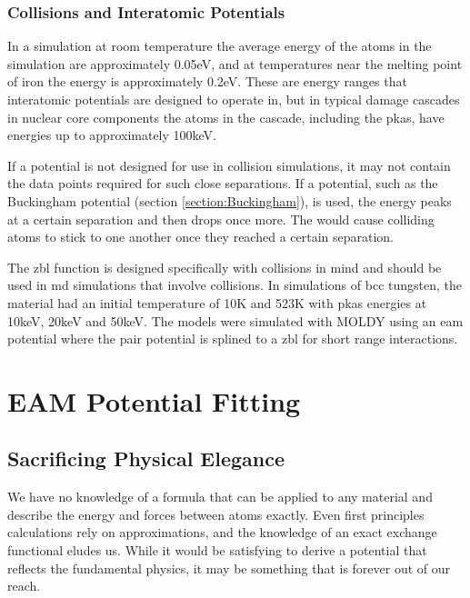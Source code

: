 \subsubsection{Collisions and Interatomic Potentials}

In a simulation at room temperature the average energy of the atoms in the simulation are approximately 0.05eV, and at temperatures near the melting point of iron the energy is approximately 0.2eV.  These are energy ranges that interatomic potentials are designed to operate in, but in typical damage cascades in nuclear core components the atoms in the cascade, including the \acrshort{pka}s, have energies up to approximately 100keV.

If a potential is not designed for use in collision simulations, it may not contain the data points required for such close separations.  If a potential, such as the Buckingham potential (section \ref{section:Buckingham}), is used, the energy peaks at a certain separation and then drops once more.  The would cause colliding atoms to stick to one another once they reached a certain separation.

The \acrshort{zbl} function is designed specifically with collisions in mind and should be used in \acrshort{md} simulations that involve collisions.  In simulations of \acrshort{bcc} tungsten\cite{tungstenfikarschaublin}, the material had an initial temperature of 10K and 523K with \acrshort{pka}s energies at 10keV, 20keV and 50keV.  The models were simulated with MOLDY using an \acrshort{eam} potential where the pair potential is splined to a \acrshort{zbl} for short range interactions.



\FloatBarrier
\section{EAM Potential Fitting}


\subsection{Sacrificing Physical Elegance}

We have no knowledge of a formula that can be applied to any material and describe the energy and forces between atoms exactly.  Even first principles calculations rely on approximations, and the knowledge of an exact exchange functional eludes us.  While it would be satisfying to derive a potential that reflects the fundamental physics, it may be something that is forever out of our reach.

